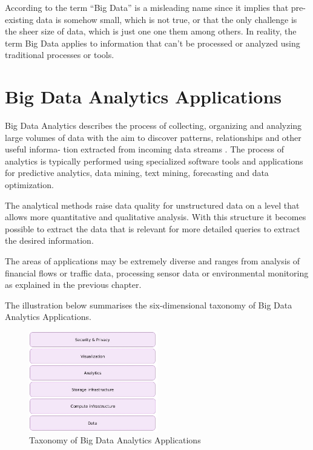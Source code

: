 According to \cite{Marz15} the term “Big Data” is a misleading name since it implies that
pre-existing data is somehow small, which is not true, or that the only challenge is the
sheer size of data, which is just one one them among others. In reality, the term Big Data
applies to information that can’t be processed or analyzed using traditional processes or
tools.

\section{Big Data Analytics Applications}
Big Data Analytics describes the process of collecting, organizing and analyzing large
volumes of data with the aim to discover patterns, relationships and other useful informa-
tion extracted from incoming data streams \cite{Marz15}. The process of analytics is typically
performed using specialized software tools and applications for predictive analytics, data
mining, text mining, forecasting and data optimization.

The analytical methods raise data quality for unstructured data on a level that allows
more quantitative and qualitative analysis. With this structure it becomes possible
to extract the data that is relevant for more detailed queries to extract the desired information.

The areas of applications may be extremely diverse and ranges from analysis of financial
flows or traffic data, processing sensor data or environmental monitoring as explained in
the previous chapter.

The illustration below summarises the six-dimensional taxonomy \cite{Bitk14, Csa14} of Big
Data Analytics Applications.
\begin{figure}[H]
	\centering
	\includegraphics[width=0.5\textwidth]{../images/05-big-data-taxonomy.jpg}
	\caption{Taxonomy of Big Data Analytics Applications \cite{Csa14}}
	\label{taxonomy-bigdata-applications}
\end{figure}

